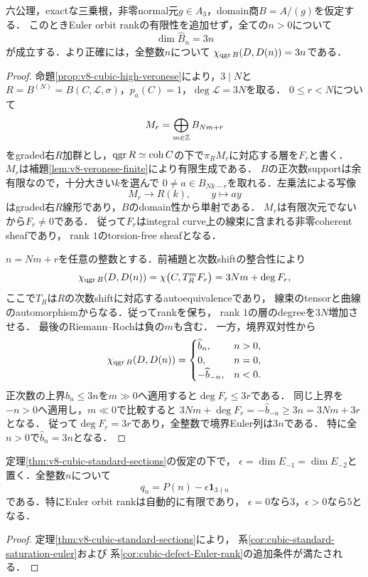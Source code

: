 \documentclass[11pt,a4paper]{ltjsarticle}
\begin{document}
\begin{theorem}
\label{thm:v8-cubic-standard-sections}
六公理，exactな三乗根，非零normal元$g\in A_3$，domain商$B=A/(g)$を仮定する．
このときEuler orbit rankの有限性を追加せず，全ての$n>0$について
\[
 \dim\widehat B_n=3n
\]
が成立する．より正確には，全整数$n$について
$\chi_{\operatorname{qgr} B}(D,D(n))=3n$である．
\end{theorem}
\begin{proof}
命題\ref{prop:v8-cubic-high-veronese}により，$3\mid N$と
$R=B^{(N)}=B(C,\mathcal L,\sigma)$，$p_a(C)=1$，$\deg\mathcal L=3N$を取る．
$0\le r<N$について
\[
 M_r=\bigoplus_{m\in\mathbb Z}B_{Nm+r}
\]
をgraded右$R$加群とし，$\operatorname{qgr} R\simeq\operatorname{coh} C$の下で$\pi_RM_r$に対応する層を$F_r$と書く．
$M_r$は補題\ref{lem:v8-veronese-finite}により有限生成である．
$B$の正次数supportは余有限なので，十分大きい$k$を選んで
$0\ne a\in B_{Nk-r}$を取れる．左乗法による写像
\[
 M_r\longrightarrow R(k),\qquad y\longmapsto ay
\]
はgraded右$R$線形であり，$B$のdomain性から単射である．
$M_r$は有限次元でないから$F_r\ne0$である．
従って$F_r$はintegral curve上の線束に含まれる非零coherent sheafであり，
rank $1$のtorsion-free sheafとなる．

$n=Nm+r$を任意の整数とする．前補題と次数shiftの整合性により
\[
 \chi_{\operatorname{qgr} B}(D,D(n))
 =\chi\bigl(C,T_R^mF_r\bigr)
 =3Nm+\deg F_r,
\]
ここで$T_R$は$R$の次数shiftに対応するautoequivalenceであり，
線束のtensorと曲線のautomorphismからなる．従ってrankを保ち，
rank $1$の層のdegreeを$3N$増加させる．
最後のRiemann--Rochは負の$m$も含む．
一方，境界双対性から
\[
 \chi_{\operatorname{qgr} B}(D,D(n))=
 \begin{cases}
 \widehat b_n,&n>0,\\
 0,&n=0,\\
 -\widehat b_{-n},&n<0.
 \end{cases}
\]
正次数の上界$\widehat b_n\le3n$を$m\gg0$へ適用すると$\deg F_r\le3r$である．
同じ上界を$-n>0$へ適用し，$m\ll0$で比較すると
$3Nm+\deg F_r=-\widehat b_{-n}\ge3n=3Nm+3r$となる．
従って$\deg F_r=3r$であり，全整数で境界Euler列は$3n$である．
特に全$n>0$で$\widehat b_n=3n$となる．
\end{proof}

\begin{corollary}[三次domain境界でのEuler列と有限rank]
\label{cor:v8-cubic-automatic-euler-rank}
定理\ref{thm:v8-cubic-standard-sections}の仮定の下で，
$\epsilon=\dim E_{-1}=\dim E_{-2}$と置く．全整数$n$について
\[
 q_n=P(n)-\epsilon\mathbf1_{3\nmid n}
\]
である．特にEuler orbit rankは自動的に有限であり，
$\epsilon=0$なら$3$，$\epsilon>0$なら$5$となる．
\end{corollary}
\begin{proof}
定理\ref{thm:v8-cubic-standard-sections}により，
系\ref{cor:cubic-standard-saturation-euler}および
系\ref{cor:cubic-defect-Euler-rank}の追加条件が満たされる．
\end{proof}
\end{document}

